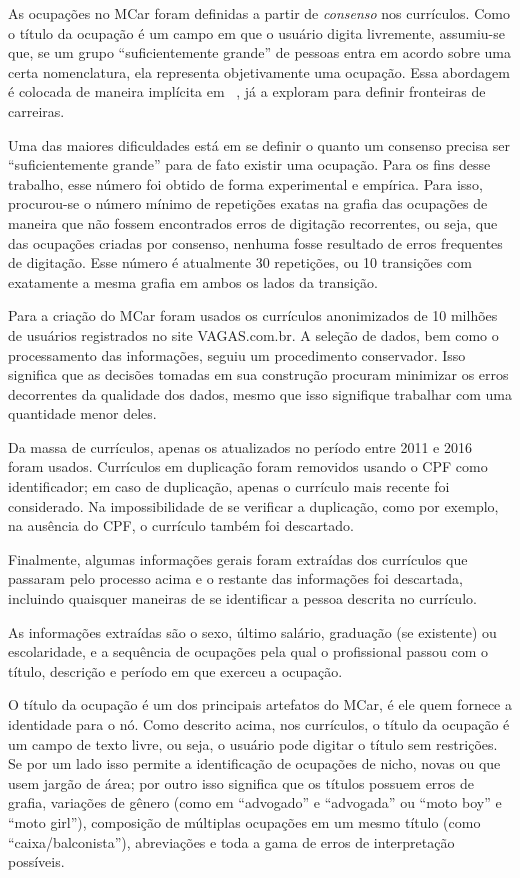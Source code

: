 \documentclass[
  article,
  11pt,
  a4paper,
  english,
  brazil,
  sumario=tradicional]{abntex2}
\begin{document}
As ocupações no MCar foram definidas a partir de \textit{consenso} nos currículos. Como o título da ocupação é um campo em que o usuário digita livremente, assumiu-se que, se um grupo \enquote{suficientemente grande} de pessoas entra em acordo sobre uma certa nomenclatura, ela representa objetivamente uma ocupação. Essa abordagem é colocada de maneira implícita em ~, já  a exploram para definir fronteiras de carreiras.

Uma das maiores dificuldades está em se definir o quanto um consenso precisa ser \enquote{suficientemente grande} para de fato existir uma ocupação. Para os fins desse trabalho, esse número foi obtido de forma experimental e empírica. Para isso, procurou-se o número mínimo de repetições exatas na grafia das ocupações de maneira que não fossem encontrados erros de digitação recorrentes, ou seja, que das ocupações criadas por consenso, nenhuma fosse resultado de erros frequentes de digitação. Esse número é atualmente 30 repetições, ou 10 transições com exatamente a mesma grafia em ambos os lados da transição.

Para a criação do MCar foram usados os currículos anonimizados de 10 milhões de usuários registrados no site VAGAS.com.br. A seleção de dados, bem como o processamento das informações, seguiu um procedimento conservador. Isso significa que as decisões tomadas em sua construção procuram minimizar os erros decorrentes da qualidade dos dados, mesmo que isso signifique trabalhar com uma quantidade menor deles.

Da massa de currículos, apenas os atualizados no período entre 2011 e 2016 foram usados. Currículos em duplicação foram removidos usando o CPF como identificador; em caso de duplicação, apenas o currículo mais recente foi considerado. Na impossibilidade de se verificar a duplicação, como por exemplo, na ausência do CPF, o currículo também foi descartado.

Finalmente, algumas informações gerais foram extraídas dos currículos que passaram pelo processo acima e o restante das informações foi descartada, incluindo quaisquer maneiras de se identificar a pessoa descrita no currículo.

As informações extraídas são o sexo, último salário, graduação (se existente) ou escolaridade, e a sequência de ocupações pela qual o profissional passou com o título, descrição e período em que exerceu a ocupação.

O título da ocupação é um dos principais artefatos do MCar, é ele quem fornece a identidade para o nó. Como descrito acima, nos currículos, o título da ocupação é um campo de texto livre, ou seja, o usuário pode digitar o título sem restrições. Se por um lado isso permite a identificação de ocupações de nicho, novas ou que usem jargão de área; por outro isso significa que os títulos possuem erros de grafia, variações de gênero (como em \enquote{advogado} e \enquote{advogada} ou \enquote{moto boy} e \enquote{moto girl}), composição de múltiplas ocupações em um mesmo título (como \enquote{caixa/balconista}), abreviações e toda a gama de erros de interpretação possíveis.
\end{document}
